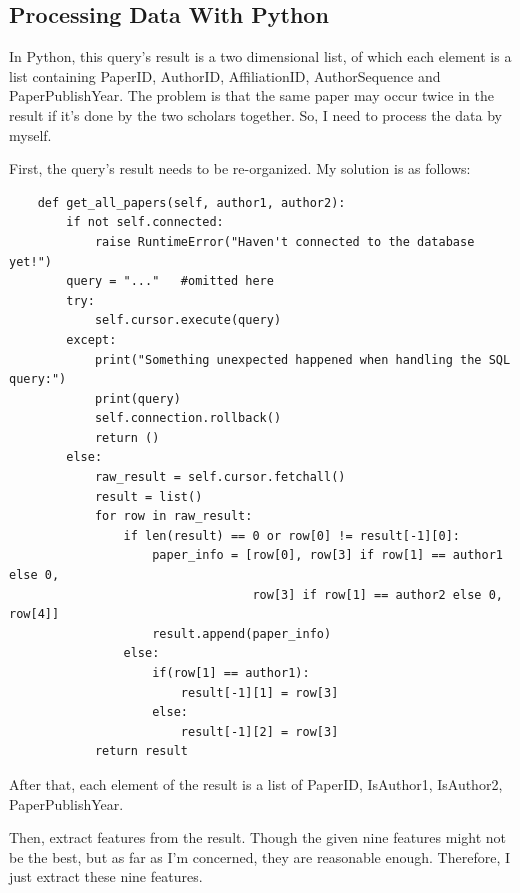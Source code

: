 \documentclass[a4paper]{article}
\begin{document}
        \subsection{Processing Data With Python}
In Python, this query's result is a two dimensional list, of which each element is a list containing PaperID, AuthorID, AffiliationID, AuthorSequence and PaperPublishYear. The problem is that the same paper may occur twice in the result if it's done by the two scholars together. So, I need to process the data by myself.

First, the query's result needs to be re-organized. My solution is as follows:
\begin{verbatim}
    def get_all_papers(self, author1, author2):
        if not self.connected:
            raise RuntimeError("Haven't connected to the database yet!")
        query = "..."   #omitted here
        try:
            self.cursor.execute(query)
        except:
            print("Something unexpected happened when handling the SQL query:")
            print(query)
            self.connection.rollback()
            return ()
        else:
            raw_result = self.cursor.fetchall()
            result = list()
            for row in raw_result:
                if len(result) == 0 or row[0] != result[-1][0]:
                    paper_info = [row[0], row[3] if row[1] == author1 else 0,
                                  row[3] if row[1] == author2 else 0, row[4]]
                    result.append(paper_info)
                else:
                    if(row[1] == author1):
                        result[-1][1] = row[3]
                    else:
                        result[-1][2] = row[3]
            return result
\end{verbatim}
After that, each element of the result is a list of PaperID, IsAuthor1, IsAuthor2, PaperPublishYear.

Then, extract features from the result. Though the given nine features might not be the best, but as far as I'm concerned, they are reasonable enough. Therefore, I just extract these nine features.
\end{document}
